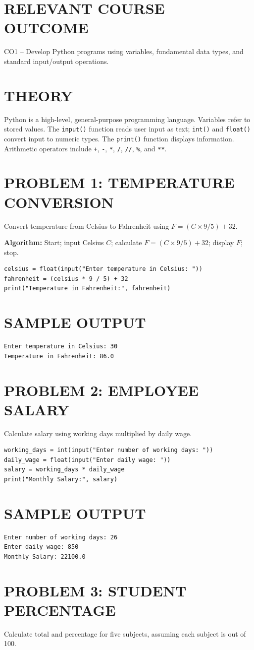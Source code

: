 \documentclass[12pt,a4paper]{report}
\newcommand{\courseoutcome}[1]{\section*{RELEVANT COURSE OUTCOME}#1}
\newcommand{\sampleoutput}{\section*{SAMPLE OUTPUT}}
\begin{document}
\courseoutcome{CO1 -- Develop Python programs using variables, fundamental data types, and standard input/output operations.}

\section*{THEORY}
Python is a high-level, general-purpose programming language. Variables refer to stored
values. The \texttt{input()} function reads user input as text; \texttt{int()} and
\texttt{float()} convert input to numeric types. The \texttt{print()} function displays
information. Arithmetic operators include \texttt{+}, \texttt{-}, \texttt{*}, \texttt{/},
\texttt{//}, \texttt{\%}, and \texttt{**}.

\section*{PROBLEM 1: TEMPERATURE CONVERSION}
Convert temperature from Celsius to Fahrenheit using
\(F=(C\times 9/5)+32\).

\textbf{Algorithm:} Start; input Celsius \(C\); calculate \(F=(C\times9/5)+32\);
display \(F\); stop.

\begin{lstlisting}
celsius = float(input("Enter temperature in Celsius: "))
fahrenheit = (celsius * 9 / 5) + 32
print("Temperature in Fahrenheit:", fahrenheit)
\end{lstlisting}
\sampleoutput
\begin{verbatim}
Enter temperature in Celsius: 30
Temperature in Fahrenheit: 86.0
\end{verbatim}

\section*{PROBLEM 2: EMPLOYEE SALARY}
Calculate salary using working days multiplied by daily wage.

\begin{lstlisting}
working_days = int(input("Enter number of working days: "))
daily_wage = float(input("Enter daily wage: "))
salary = working_days * daily_wage
print("Monthly Salary:", salary)
\end{lstlisting}
\sampleoutput
\begin{verbatim}
Enter number of working days: 26
Enter daily wage: 850
Monthly Salary: 22100.0
\end{verbatim}

\section*{PROBLEM 3: STUDENT PERCENTAGE}
Calculate total and percentage for five subjects, assuming each subject is out of 100.
\end{document}
